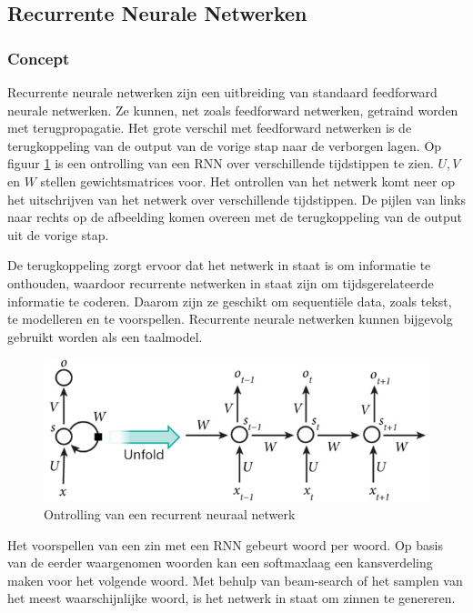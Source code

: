 \subsection{Recurrente Neurale Netwerken}
\subsubsection{Concept}
Recurrente neurale netwerken zijn een uitbreiding van standaard feedforward neurale netwerken. Ze kunnen, net zoals feedforward netwerken, getraind worden met terugpropagatie. Het grote verschil met feedforward netwerken is de terugkoppeling van de output van de vorige stap naar de verborgen lagen. Op figuur \ref{fig:rnn} is een ontrolling van een RNN over verschillende tijdstippen te zien. $U,V$ en $W$ stellen gewichtsmatrices voor. Het ontrollen van het netwerk komt neer op het uitschrijven van het netwerk over verschillende tijdstippen. De pijlen van links naar rechts op de afbeelding komen overeen met de terugkoppeling van de output uit de vorige stap.

De terugkoppeling zorgt ervoor dat het netwerk in staat is om informatie te onthouden, waardoor recurrente netwerken in staat zijn om tijdsgerelateerde informatie te coderen. Daarom zijn ze geschikt om sequenti\"ele data, zoals tekst, te modelleren en te voorspellen. Recurrente neurale netwerken kunnen bijgevolg gebruikt worden als een taalmodel\cite{Mikolov2010}.

\begin{figure}[tb]
    \centering
    \includegraphics[width=\linewidth]{Images/rnn.PNG}
    \caption{Ontrolling van een recurrent neuraal netwerk\cite{RNNTutorial}}
    \label{fig:rnn}
\end{figure}

Het voorspellen van een zin met een RNN gebeurt woord per woord. Op basis van de eerder waargenomen woorden kan een softmaxlaag een kansverdeling maken voor het volgende woord. Met behulp van beam-search of het samplen van het meest waarschijnlijke woord, is het netwerk in staat om zinnen te genereren. 

